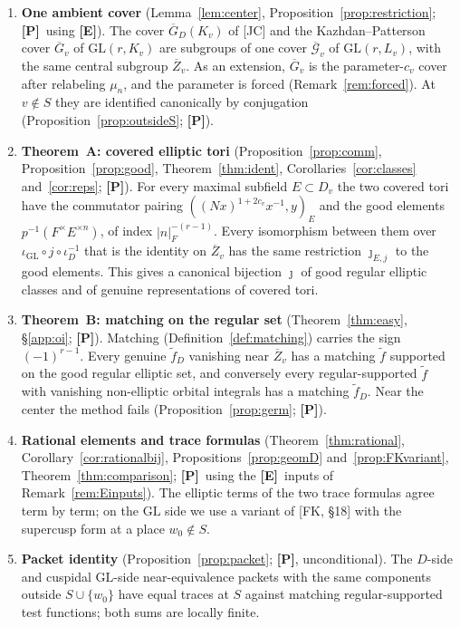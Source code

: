 \documentclass[12pt]{article}
\newcommand{\ov}[1]{\overline{#1}}
\newcommand{\GL}{\mathrm{GL}}
\newcommand{\Gb}{\ov{G}}
\newcommand{\Zb}{\ov{Z}}
\newcommand{\GDb}{\ov{G}_D}
\newcommand{\cGb}{\ov{\mathcal{G}}}
\newcommand{\iD}{\iota_D}
\newcommand{\iG}{\iota_{\GL}}
\newcommand{\jj}{\jmath}
\newcommand{\Pv}{\textbf{[P]}}
\newcommand{\Ev}{\textbf{[E]}}
\theoremstyle{plain}
\theoremstyle{definition}
\begin{document}
\begin{enumerate}[leftmargin=*,label=\arabic*.]
\item \textbf{One ambient cover} (Lemma~\ref{lem:center}, Proposition~\ref{prop:restriction}; \Pv\ using \Ev). The cover $\GDb(K_v)$ of [JC] and the Kazhdan--Patterson cover $\Gb_v$ of $\GL(r,K_v)$ are subgroups of one cover $\cGb_v$ of $\GL(r,L_v)$, with the same central subgroup $\Zb_v$. As an extension, $\Gb_v$ is the parameter-$c_v$ cover after relabeling $\mu_n$, and the parameter is forced (Remark~\ref{rem:forced}). At $v\notin S$ they are identified canonically by conjugation (Proposition~\ref{prop:outsideS}; \Pv).
\item \textbf{Theorem~A: covered elliptic tori} (Proposition~\ref{prop:comm}, Proposition~\ref{prop:good}, Theorem~\ref{thm:ident}, Corollaries~\ref{cor:classes} and~\ref{cor:reps}; \Pv). For every maximal subfield $E\subset D_v$ the two covered tori have the commutator pairing $((Nx)^{1+2c_v}x^{-1},y)_E$ and the good elements $p^{-1}(F^\times E^{\times n})$, of index $|n|_F^{-(r-1)}$. Every isomorphism between them over $\iG\circ j\circ\iD^{-1}$ that is the identity on $\Zb_v$ has the same restriction $\jj_{E,j}$ to the good elements. This gives a canonical bijection $\jj$ of good regular elliptic classes and of genuine representations of covered tori.
\item \textbf{Theorem~B: matching on the regular set} (Theorem~\ref{thm:easy}, \S\ref{app:oi}; \Pv). Matching (Definition~\ref{def:matching}) carries the sign $(-1)^{r-1}$. Every genuine $\tilde f_D$ vanishing near $\Zb_v$ has a matching $\tilde f$ supported on the good regular elliptic set, and conversely every regular-supported $\tilde f$ with vanishing non-elliptic orbital integrals has a matching $\tilde f_D$. Near the center the method fails (Proposition~\ref{prop:germ}; \Pv).
\item \textbf{Rational elements and trace formulas} (Theorem~\ref{thm:rational}, Corollary~\ref{cor:rationalbij}, Propositions~\ref{prop:geomD} and~\ref{prop:FKvariant}, Theorem~\ref{thm:comparison}; \Pv\ using the \Ev\ inputs of Remark~\ref{rem:Einputs}). The elliptic terms of the two trace formulas agree term by term; on the $\GL$ side we use a variant of [FK, \S18] with the supercusp form at a place $w_0\notin S$.
\item \textbf{Packet identity} (Proposition~\ref{prop:packet}; \Pv, unconditional). The $D$-side and cuspidal $\GL$-side near-equivalence packets with the same components outside $S\cup\{w_0\}$ have equal traces at $S$ against matching regular-supported test functions; both sums are locally finite.

\end{enumerate}
\end{document}

